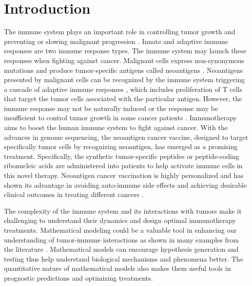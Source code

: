 \documentclass[review,authoryear]{elsarticle}
\begin{document}
\linenumbers

\section{Introduction}

The immune system plays an important role in controlling tumor growth
and preventing or slowing malignant progression \citep{Waldman2020}. Innate and adaptive
immune responses are two immune response types. The immune system may launch these responses when fighting against cancer. Malignant cells express non-synonymous mutations
and produce tumor-specific antigens called neoantigens \citep{Peng2019}.
Neoantigens presented by malignant cells can be recognized by the immune system triggering a cascade of adaptive
immune responses \citep{Zhang2021}, which includes proliferation of T cells
that target the tumor cells associated with the particular antigen.
However, the immune response may not be naturally induced or the response may be insufficient to control tumor growth in some cancer patients \citep{Ward2016}. Immunotherapy aims to boost the human immune system to fight
against cancer. With the advances in genome sequencing, the neoantigen
cancer vaccine, designed to target specifically tumor cells
by recognizing neoantigen, has emerged as a promising treatment. Specifically, the synthetic tumor-specific
peptides or peptide-coding ribonucleic acids are administered into patients to help activate immune cells in this novel therapy. Neoantigen cancer vaccination is highly personalized and has shown its advantage in avoiding auto-immune
side effects \citep{Nelde2021} and achieving desirable clinical outcomes in
treating different cancers
\citep[e.g.][]{Ott2017,Pan2018,Peng2019}. 

The complexity of the immune system and its interactions with tumors
make it challenging to understand their dynamics and design optimal
immunotherapy treatments. Mathematical modeling could be a valuable tool in enhancing our understanding of tumor-immune interactions as shown in many examples from the literature \citep[e.g., see reviews by][and references therein]{Eftimie2016,Mahlbacher2019,Nukala2021}. Mathematical models can encourage hypothesis generation and testing thus help understand biological mechanisms and phenomena better. The
quantitative nature of mathematical models also makes them useful tools in prognostic predictions and optimizing treatments. 
\end{document}
